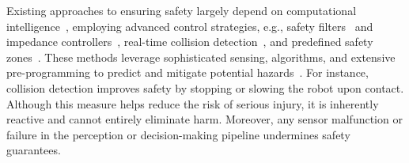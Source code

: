 Existing approaches to ensuring safety largely depend on computational intelligence~\citep{ahn2024autort, sermanet2025generatingrobotconstitutions}, employing advanced control strategies, e.g., safety filters~\citep{ames2016control} and impedance controllers~\citep{khatib1987unified}, real-time collision detection~\citep{haddadin2017robot}, and predefined safety zones~\citep{zhao2024potential}. These methods leverage sophisticated sensing, algorithms, and extensive pre-programming to predict and mitigate potential hazards~\citep{fragapane2021planning}. For instance, collision detection improves safety by stopping or slowing the robot upon contact. Although this measure helps reduce the risk of serious injury, it is inherently reactive and cannot entirely eliminate harm. Moreover, any sensor malfunction or failure in the perception or decision-making pipeline undermines safety guarantees.

